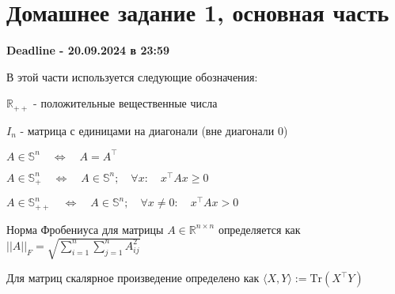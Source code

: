 \documentclass[a5paper,twoside,russian]{article}
\def\la{\langle}
\def\ra{\rangle}
\begin{document}

\section{Домашнее задание 1, основная часть}

\begin{center}
    \textbf{Deadline - 20.09.2024 в 23:59}
\end{center}

В этой части используется следующие обозначения:

$\mathbb{R}_{++}$ - положительные вещественные числа

$I_n$ - матрица с единицами на диагонали (вне диагонали 0)

$A \in \mathbb{S}^n \quad\Longleftrightarrow \quad A= A^\top$

$A \in \mathbb{S}^n_+ \quad\Longleftrightarrow \quad A \in \mathbb{S}^n ; \quad  \forall x: \quad  x^\top Ax \geq 0$

$A \in \mathbb{S}^n_{++}\quad \Longleftrightarrow \quad A \in \mathbb{S}^n ; \quad \forall x \neq 0: \quad  x^\top Ax > 0$

Норма Фробениуса для матрицы $A \in \mathbb{R}^{n \times n}$ определяется как $||A||_F = \sqrt{\sum_{i=1}^n \sum_{j=1}^n A^2_{ij}}$

Для матриц скалярное произведение определено как $\la X, Y \ra := \text{Tr}(X^\top Y)$
\end{document}
